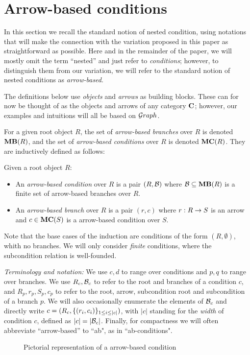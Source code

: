 \section{Arrow-based conditions}
 
In this section we recall the standard notion of nested condition, using notations that will make the connection with the variation proposed in this paper as straightforward as possible. Here and in the remainder of the paper, we will mostly omit the term ``nested'' and just refer to \emph{conditions}; however, to distinguish them from our variation, we will refer to the standard notion of nested conditions as \emph{arrow-based}.

The definitions below use \emph{objects} and \emph{arrows} as building blocks. These can for now be thought of as the objects and arrows of any category $\mathbf{C}$; however, our examples and intuitions will all be based on ${\mathcal Graph}$.

For a given root object $R$, the set of \emph{arrow-based branches} over $R$ is denoted $\MB{R}$, and the set of \emph{arrow-based conditions} over $R$ is denoted $\MC R$. They are inductively defined as follows:

\begin{definition}
  Given a root object $R$:
  \begin{itemize}
  \item An \emph{arrow-based condition} over $R$ is a pair $(R,\mathcal{B})$ where $\cB\subseteq \MB R$ is a finite set of arrow-based branches over $R$.
  \item An \emph{arrow-based branch} over $R$ is a pair $(r,c)$ where $r: R\rightarrow S$ is an arrow and $c\in \MC S$ is a arrow-based condition over $S$.
  \end{itemize}
\end{definition}
%

Note that the base cases of the induction are conditions of the form $(R,\emptyset)$, whith no branches. We will only consider \emph{finite} conditions, where the subcondition relation is well-founded.%



\emph{Terminology and notation:} We use $c,d$ to range over conditions and $p,q$ to range over branches. We use $R_c,\mathcal{B}_c$ to refer to the root and branches of a condition $c$, and $R_p,r_p,S_p,c_p$ to refer to the root, arrow, subcondition root and subcondition of a branch $p$. We will also occasionally enumerate the elements of $\mathcal{B}_c$ and directly write $c=(R_c, \{{(r_i, c_i)}\}_{1\leq i\leq |c|})$, with $|c|$ standing for the \emph{width} of condition $c$, defined as $|c|=|\mathcal{B}_c|$. Finally, for compactness we will often abbreviate ``arrow-based'' to ``ab", as in ``ab-conditions".
%
\begin{figure}
  \centering
  
  \caption{Pictorial representation of a arrow-based condition}
\end{figure}

